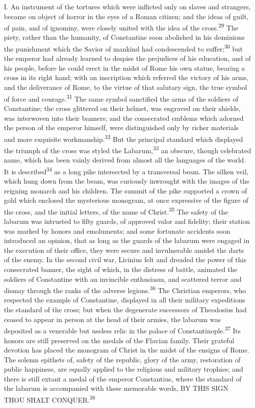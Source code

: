I. An instrument of the tortures which were inflicted only on slaves
and strangers, became on object of horror in the eyes of a Roman
citizen; and the ideas of guilt, of pain, and of ignominy, were closely
united with the idea of the cross.\textsuperscript{29} The piety, rather than the
humanity, of Constantine soon abolished in his dominions the punishment
which the Savior of mankind had condescended to suffer;\textsuperscript{30} but the
emperor had already learned to despise the prejudices of his education,
and of his people, before he could erect in the midst of Rome his own
statue, bearing a cross in its right hand; with an inscription which
referred the victory of his arms, and the deliverance of Rome, to the
virtue of that salutary sign, the true symbol of force and courage.\textsuperscript{31}
The same symbol sanctified the arms of the soldiers of Constantine; the
cross glittered on their helmet, was engraved on their shields, was
interwoven into their banners; and the consecrated emblems which
adorned the person of the emperor himself, were distinguished only by
richer materials and more exquisite workmanship.\textsuperscript{32} But the principal
standard which displayed the triumph of the cross was styled the
Labarum,\textsuperscript{33} an obscure, though celebrated name, which has been vainly
derived from almost all the languages of the world. It is described\textsuperscript{34}
as a long pike intersected by a transversal beam. The silken veil,
which hung down from the beam, was curiously inwrought with the images
of the reigning monarch and his children. The summit of the pike
supported a crown of gold which enclosed the mysterious monogram, at
once expressive of the figure of the cross, and the initial letters, of
the name of Christ.\textsuperscript{35} The safety of the labarum was intrusted to fifty
guards, of approved valor and fidelity; their station was marked by
honors and emoluments; and some fortunate accidents soon introduced an
opinion, that as long as the guards of the labarum were engaged in the
execution of their office, they were secure and invulnerable amidst the
darts of the enemy. In the second civil war, Licinius felt and dreaded
the power of this consecrated banner, the sight of which, in the
distress of battle, animated the soldiers of Constantine with an
invincible enthusiasm, and scattered terror and dismay through the
ranks of the adverse legions.\textsuperscript{36} The Christian emperors, who respected
the example of Constantine, displayed in all their military expeditions
the standard of the cross; but when the degenerate successors of
Theodosius had ceased to appear in person at the head of their armies,
the labarum was deposited as a venerable but useless relic in the
palace of Constantinople.\textsuperscript{37} Its honors are still preserved on the
medals of the Flavian family. Their grateful devotion has placed the
monogram of Christ in the midst of the ensigns of Rome. The solemn
epithets of, safety of the republic, glory of the army, restoration of
public happiness, are equally applied to the religious and military
trophies; and there is still extant a medal of the emperor Constantius,
where the standard of the labarum is accompanied with these memorable
words, BY THIS SIGN THOU SHALT CONQUER.\textsuperscript{38}

